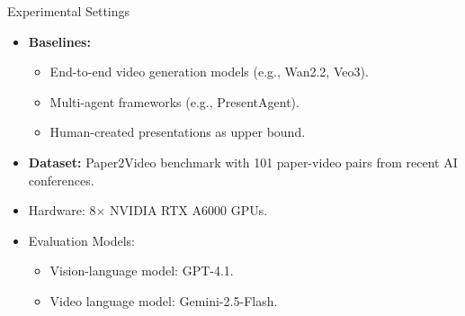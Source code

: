 \documentclass{beamer}
\newcommand{\alertterm}[1]{\alert{\textbf{#1}}}
\begin{document}
\begin{frame}{Experimental Settings}
\begin{itemize}
  \item \alertterm{Baselines:}
  \begin{itemize}
    \item End-to-end video generation models (e.g., Wan2.2, Veo3).
    \item Multi-agent frameworks (e.g., PresentAgent).
    \item Human-created presentations as upper bound.
  \end{itemize}
  \item \alertterm{Dataset:} Paper2Video benchmark with 101 paper-video pairs from recent AI conferences.
  \item Hardware: 8$\times$ NVIDIA RTX A6000 GPUs.
  \item Evaluation Models:
  \begin{itemize}
    \item Vision-language model: GPT-4.1.
    \item Video language model: Gemini-2.5-Flash.
  \end{itemize}
\end{itemize}
\end{frame}
\end{document}
